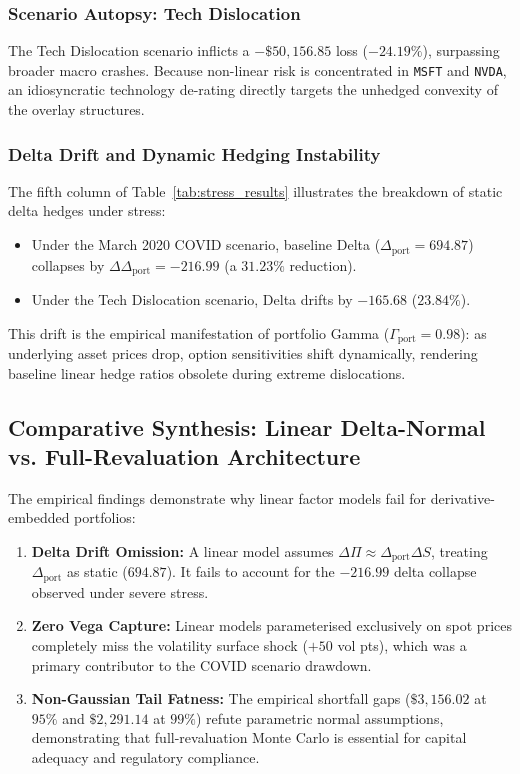 \documentclass{article}
\theoremstyle{plain}
\theoremstyle{definition}
\theoremstyle{remark}
\begin{document}
\subsubsection{Scenario Autopsy: Tech Dislocation}
The Tech Dislocation scenario inflicts a $-\$50,156.85$ loss ($-24.19\%$), surpassing broader macro crashes. Because non-linear risk is concentrated in \texttt{MSFT} and \texttt{NVDA}, an idiosyncratic technology de-rating directly targets the unhedged convexity of the overlay structures.

\subsubsection{Delta Drift and Dynamic Hedging Instability}
The fifth column of Table~\ref{tab:stress_results} illustrates the breakdown of static delta hedges under stress:
\begin{itemize}
    \item Under the March 2020 COVID scenario, baseline Delta ($\Delta_{\text{port}} = 694.87$) collapses by $\Delta \Delta_{\text{port}} = -216.99$ (a $31.23\%$ reduction).
    \item Under the Tech Dislocation scenario, Delta drifts by $-165.68$ ($23.84\%$).
\end{itemize}
This drift is the empirical manifestation of portfolio Gamma ($\Gamma_{\text{port}} = 0.98$): as underlying asset prices drop, option sensitivities shift dynamically, rendering baseline linear hedge ratios obsolete during extreme dislocations.

\subsection{Comparative Synthesis: Linear Delta-Normal vs. Full-Revaluation Architecture}
\label{sec:ch4_synthesis}
The empirical findings demonstrate why linear factor models fail for derivative-embedded portfolios:
\begin{enumerate}
    \item \textbf{Delta Drift Omission:} A linear model assumes $\Delta \Pi \approx \Delta_{\text{port}} \Delta S$, treating $\Delta_{\text{port}}$ as static ($694.87$). It fails to account for the $-216.99$ delta collapse observed under severe stress.
    \item \textbf{Zero Vega Capture:} Linear models parameterised exclusively on spot prices completely miss the volatility surface shock ($+50$ vol pts), which was a primary contributor to the COVID scenario drawdown.
    \item \textbf{Non-Gaussian Tail Fatness:} The empirical shortfall gaps ($\$3,156.02$ at $95\%$ and $\$2,291.14$ at $99\%$) refute parametric normal assumptions, demonstrating that full-revaluation Monte Carlo is essential for capital adequacy and regulatory compliance.
\end{enumerate}
\end{document}
